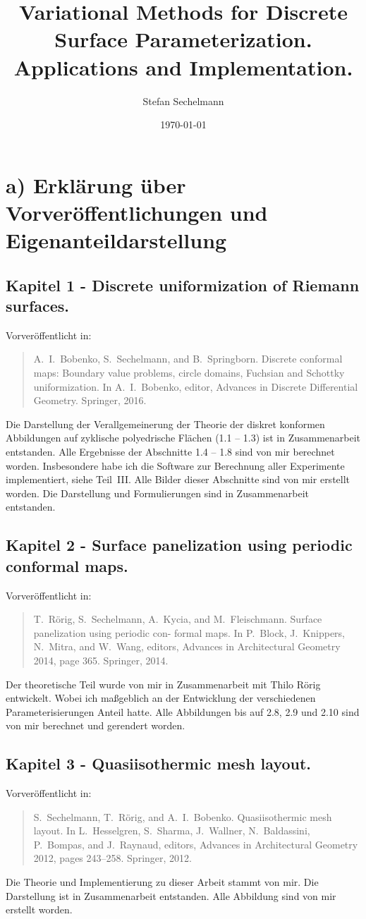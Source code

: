 \documentclass[11pt]{article}
\title{Variational Methods for Discrete Surface Parameterization. Applications and Implementation.}
\author{Stefan Sechelmann}
\date{\today}
\begin{document}
\maketitle

\section*{a) Erklärung über Vorveröffentlichungen und Eigenanteildarstellung}
\label{sec:eigenanteil}

\subsection*{Kapitel 1 - Discrete uniformization of Riemann surfaces.}
Vorveröffentlicht in:
\begin{quote}
A.~I.~Bobenko, S.~Sechelmann, and B.~Springborn. Discrete conformal maps: Boundary value problems, circle domains, Fuchsian and Schottky uniformization. In A.~I.~Bobenko, editor, Advances in Discrete Differential Geometry. Springer, 2016.
\end{quote}
Die Darstellung der Verallgemeinerung der Theorie der diskret konformen Abbildungen auf zyklische polyedrische Flächen (1.1 -- 1.3) ist in Zusammenarbeit entstanden.
Alle Ergebnisse der Abschnitte 1.4 -- 1.8 sind von mir berechnet worden. Insbesondere habe ich die Software zur Berechnung aller Experimente implementiert, siehe Teil~III. Alle Bilder dieser Abschnitte sind von mir erstellt worden. Die Darstellung und Formulierungen sind in Zusammenarbeit entstanden.

\subsection*{Kapitel 2 - Surface panelization using periodic conformal maps.}
Vorveröffentlicht in:
\begin{quote}
T.~Rörig, S.~Sechelmann, A.~Kycia, and M.~Fleischmann. Surface panelization using periodic con- formal maps. In P.~Block, J.~Knippers, N.~Mitra, and W.~Wang, editors, Advances in Architectural Geometry 2014, page 365. Springer, 2014.
\end{quote}
Der theoretische Teil wurde von mir in Zusammenarbeit mit Thilo Rörig entwickelt. Wobei ich maßgeblich an der Entwicklung der verschiedenen Parameterisierungen Anteil hatte. 
Alle Abbildungen bis auf 2.8, 2.9 und 2.10 sind von mir berechnet und gerendert worden.

\subsection*{Kapitel 3 - Quasiisothermic mesh layout.}
Vorveröffentlicht in:
\begin{quote}
S.~Sechelmann, T.~Rörig, and A.~I.~Bobenko. Quasiisothermic mesh layout. In L.~Hesselgren, S.~Sharma, J.~Wallner, N.~Baldassini, P.~Bompas, and J.~Raynaud, editors, Advances in Architectural Geometry 2012, pages 243–258. Springer, 2012.
\end{quote}
Die Theorie und Implementierung zu dieser Arbeit stammt von mir. Die Darstellung ist in Zusammenarbeit entstanden. Alle Abbildung sind von mir erstellt worden.
\end{document}
